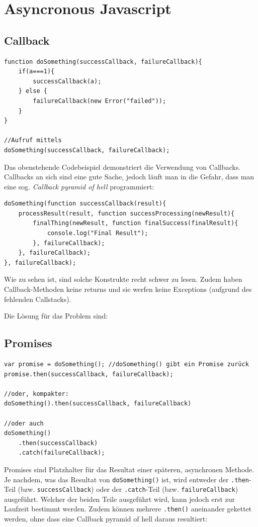 \documentclass[a4paper, 11pt]{article}
\newcommand{\code}[1]{\texttt{#1}}
\begin{document}
\section{Asyncronous Javascript}
\subsection{Callback}
\begin{lstlisting}
function doSomething(successCallback, failureCallback){
	if(a===1){
		successCallback(a);
	} else {
		failureCallback(new Error("failed"));
	}
}

//Aufruf mittels
doSomething(successCallback, failureCallback);
\end{lstlisting}
Das obenstehende Codebeispiel demonstriert die Verwendung von Callbacks. Callbacks an sich sind eine gute Sache, jedoch läuft man in die Gefahr, dass man eine sog. \textit{Callback pyramid of hell} programmiert:

\begin{lstlisting}
doSomething(function successCallback(result){
	processResult(result, function successProcessing(newResult){
		finalThing(newResult, function finalSuccess(finalResult){
			console.log("Final Result");
		}, failureCallback);
	}, failureCallback);
}, failureCallback);
\end{lstlisting}
Wie zu sehen ist, sind solche Konstrukte recht schwer zu lesen. Zudem haben Callback-Methoden keine returns und sie werfen keine Exceptions (aufgrund des fehlenden Callstacks).

\noindent Die Lösung für das Problem sind:

\subsection{Promises}
\begin{lstlisting}
var promise = doSomething(); //doSomething() gibt ein Promise zurück
promise.then(successCallback, failureCallback);

//oder, kompakter:
doSomething().then(successCallback, failureCallback)

//oder auch
doSomething()
	.then(successCallback)
	.catch(failureCallback);
\end{lstlisting}

Promises sind Platzhalter für das Resultat einer späteren, asynchronen Methode. Je nachdem, was das Resultat von \code{doSomething()} ist, wird entweder der \code{.then}-Teil (bzw. \code{successCallback}) oder der \code{.catch}-Teil (bzw. \code{failureCallback}) ausgeführt. Welcher der beiden Teile ausgeführt wird, kann jedoch erst zur Laufzeit bestimmt werden. Zudem können mehrere \code{.then()} aneinander gekettet werden, ohne dass eine Callback pyramid of hell daraus resultiert:
\end{document}
